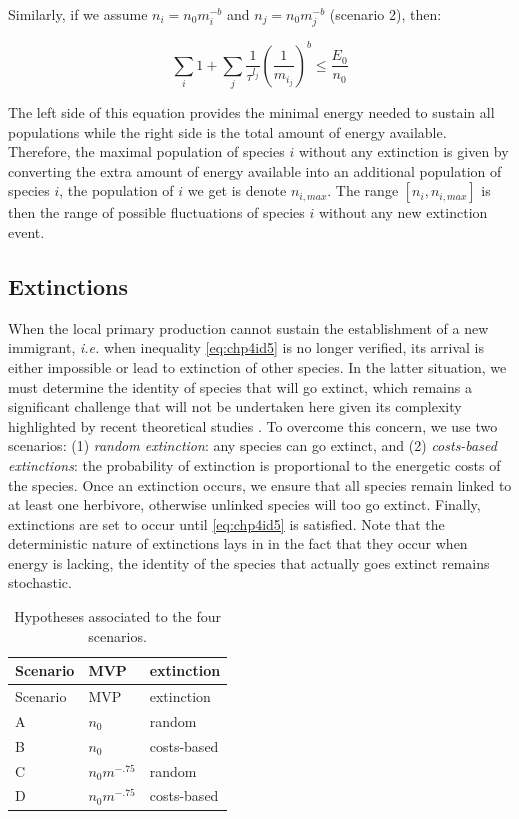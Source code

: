 Similarly, if we assume \(n_i=n_0m_i^{-b}\) and \(n_j=n_0m_j^{-b}\)
(scenario 2), then:

\begin{equation} \sum_i 1 + \sum_j \frac{1}{\tau^{l_j}} \left( \frac{1}{m_{i_j}} \right)^b \leq \frac{E_0}{n_0} \label{eq:chp4id5b}\end{equation}

The left side of this equation provides the minimal energy needed to
sustain all populations while the right side is the total amount of
energy available. Therefore, the maximal population of species \(i\)
without any extinction is given by converting the extra amount of energy
available into an additional population of species \(i\), the population
of \(i\) we get is denote \(n_{i,max}\). The range \([n_i, n_{i, max}]\)
is then the range of possible fluctuations of species \(i\) without any
new extinction event.

\subsection{Extinctions}\label{extinctions}

When the local primary production cannot sustain the establishment of a
new immigrant, \emph{i.e.} when inequality \ref{eq:chp4id5} is no longer
verified, its arrival is either impossible or lead to extinction of
other species. In the latter situation, we must determine the identity
of species that will go extinct, which remains a significant challenge
that will not be undertaken here given its complexity highlighted by
recent theoretical studies \citep{Saterberg2013, Zhao2016}. To overcome
this concern, we use two scenarios: (1) \emph{random extinction}: any
species can go extinct, and (2) \emph{costs-based extinctions}: the
probability of extinction is proportional to the energetic costs of the
species. Once an extinction occurs, we ensure that all species remain
linked to at least one herbivore, otherwise unlinked species will too go
extinct. Finally, extinctions are set to occur until \ref{eq:chp4id5} is
satisfied. Note that the deterministic nature of extinctions lays in in
the fact that they occur when energy is lacking, the identity of the
species that actually goes extinct remains stochastic.

\begin{longtable}[]{@{}lll@{}}
\caption{Hypotheses associated to the four scenarios.
\label{tbl:scena}}\tabularnewline
\toprule
Scenario & MVP & extinction\tabularnewline
\midrule
\endfirsthead
\toprule
Scenario & MVP & extinction\tabularnewline
\midrule
\endhead
A & \(n_0\) & random\tabularnewline
B & \(n_0\) & costs-based\tabularnewline
C & \(n_0m^{-.75}\) & random\tabularnewline
D & \(n_0m^{-.75}\) & costs-based\tabularnewline
\bottomrule
\end{longtable}

